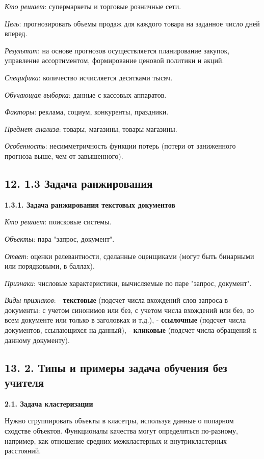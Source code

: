 \textit{Кто решает}: супермаркеты и торговые розничные сети.

\textit{Цель}: прогнозировать объемы продаж для каждого товара на заданное число
дней вперед.

\textit{Результат}: на основе прогнозов осуществляется планирование закупок,
управление ассортиментом, формирование ценовой политики и акций.

\textit{Специфика}: количество исчисляется десятками тысяч.

\textit{Обучающая выборка}: данные с кассовых аппаратов.

\textit{Факторы}: реклама, социум, конкуренты, праздники.

\textit{Предмет анализа}: товары, магазины, товары-магазины.

\textit{Особенность}: несимметричность функции потерь (потери от заниженного
прогноза выше, чем от завышенного).

\subsection{12. 1.3 Задача ранжирования}

\textbf{1.3.1. Задача ранжирования текстовых документов}

\textit{Кто решает}: поисковые системы.

\textit{Объекты}: пара "запрос, документ".

\textit{Ответ}: оценки релевантности, сделанные оценщиками (могут быть бинарными
или порядковыми, в баллах).

\textit{Признаки}: числовые характеристики, вычисляемые по паре "запрос, документ".

\textit{Виды признаков}:
- \textbf{текстовые} (подсчет числа вхождений слов запроса в документы: с учетом
синонимов или без, с учетом числа вхождений или без, во всем документе или
только в заголовках и т.д.),
- \textbf{ссылочные} (подсчет числа документов, ссылающихся на данный),
- \textbf{кликовые} (подсчет числа обращений к данному документу).

\subsection{13. 2. Типы и примеры задача обучения без учителя}

\textbf{2.1. Задача кластеризации}

Нужно сгруппировать объекты в класетры, используя данные о попарном сходстве
объектов.
Функционалы качества могут определяться по-разному, например, как
отношение средних межкластерных и внутрикластерных расстояний.

